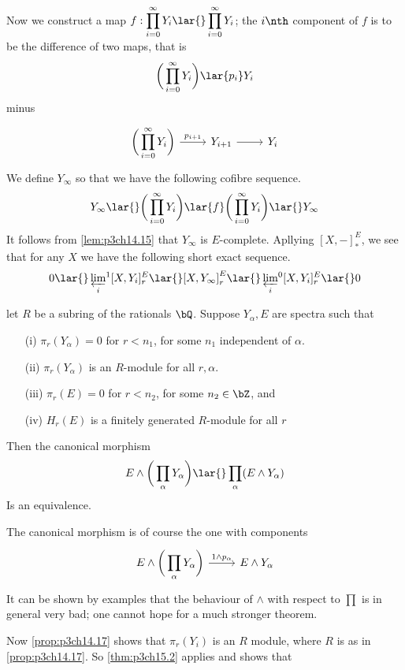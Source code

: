 \documentclass[../main]{subfiles}
\begin{document}
Now we construct a map $\displaystyle f:\prod_{i=0}^\infty Y_i\lar{}\prod_{i=0}^\infty Y_i$; the $i\nth$ component of $f$ is to be the difference of two maps, that is \[\bigg( \prod_{i=0}^\infty Y_i\bigg)\lar{p_i} Y_i\]
minus 
\[
\begin{tikzcd}
\displaystyle\bigg(\prod_{i=0}^\infty Y_i\bigg)\arrow[r,"p_{i+1}"] &Y_{i+1} \arrow[r] &Y_i
\end{tikzcd}
\]
We define $Y_\infty$ so that we have the following cofibre sequence.
\[Y_\infty\lar{}\bigg(\prod_{i=0}^\infty Y_i\bigg)\lar{f} \bigg(\prod_{i=0}^\infty Y_i\bigg)\lar{} Y_\infty  \]
It follows from \ref{lem:p3ch14.15} that $Y_\infty$ is $E$-complete. Apllying $[X,-]^E_\ast$, we see that for any $X$ we have the following short exact sequence.
\[0\lar{} \varprojlim_i\!^1[X,Y_i]^E_r\lar{}[X,Y_\infty]^E_r\lar{}\varprojlim_i  \!^0[X,Y_i]^E_r \lar{} 0 \]

\begin{customthm}{15.2}\label{thm:p3ch15.2}
let $R$ be a subring of the rationals $\bQ$. Suppose $Y_\alpha,E$ are spectra such that 
\begin{enumerate}
    \item[(i)] $\pi_r(Y_\alpha)=0$ for $r<n_1$, for some $n_1$ independent of $\alpha$.
    \item[(ii)] $\pi_r(Y_\alpha)$ is an $R$-module for all $r,\alpha$.
    \item[(iii)] $\pi_r(E)=0$ for $r<n_2$, for some $n_2\in \bZ$, and
    \item[(iv)] $H_r(E)$ is a finitely generated $R$-module for all $r$
\end{enumerate}
Then the canonical morphism
\[E\wedge\bigg(\prod_\alpha Y_\alpha \bigg)\lar{}\prod_\alpha (E\wedge Y_\alpha) \]
Is an equivalence.
\end{customthm}
The canonical morphism is of course the one with components 
\[
\begin{tikzcd}
E\wedge\bigg(\displaystyle\prod_\alpha Y_\alpha \bigg)\arrow[r,"1\wedge p_\alpha"]& E\wedge Y_\alpha\end{tikzcd} 
\]
It can be shown by examples that the behaviour of $\wedge$  with respect to $\displaystyle \prod$ is in general very bad; one cannot hope for a much stronger theorem.

Now \ref{prop:p3ch14.17} shows that $\pi_r(Y_i)$ is an $R$ module, where $R$ is as in \ref{prop:p3ch14.17}. So \ref{thm:p3ch15.2} applies and shows that 
\end{document}

